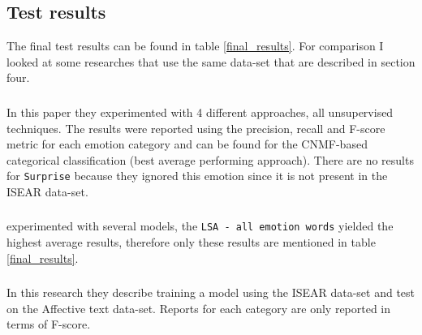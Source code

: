 \documentclass[
10pt, %
a4paper, %
oneside, %
headinclude,footinclude, %
BCOR5mm, %
]{scrartcl}
\begin{document}
\subsection{Test results}
The final test results can be found in table \ref{final_results}. For comparison I looked at some researches that use the same data-set that are described in section four.

\subsubsection{\citeauthor{kim2010evaluation}}
In this paper \citep{kim2010evaluation} they experimented with 4 different approaches, all unsupervised techniques. The results were reported using the precision, recall and F-score metric for each emotion category and can be found for the CNMF-based categorical classification (best average performing approach). There are no results for \texttt{Surprise} because they ignored this emotion since it is not present in the ISEAR data-set.

\subsubsection{\citeauthor{strapparava2008learning}}
\citet{strapparava2008learning} experimented with several models, the \texttt{LSA - all emotion words} yielded the highest average results, therefore only these results are mentioned in table \ref{final_results}.

\subsubsection{\citeauthor{danisman2008feeler}}
In this research \citep{danisman2008feeler} they describe training a model using the ISEAR data-set and test on the Affective text data-set. Reports for each category are only reported in terms of F-score.
\end{document}
